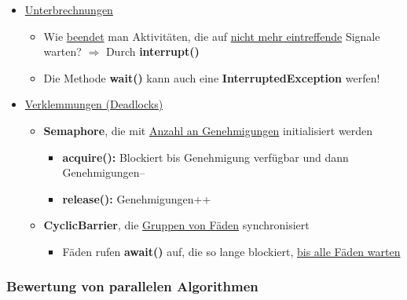 \begin{itemize}
\begin{itemize}
\begin{itemize}
						\color{red}{$\Rightarrow$ Sicher ist nur: notifyAll()}
					\end{itemize}
				\end{itemize}
				\item \underline{Unterbrechnungen}
				\begin{itemize}
					\item Wie \underline{beendet} man Aktivitäten, die auf \underline{nicht mehr eintreffende} Signale warten?
					$\Rightarrow$ Durch \textbf{interrupt()}
					\item Die Methode \textbf{wait()} kann auch eine \textbf{InterruptedException} werfen!
				\end{itemize}
				\item \underline{Verklemmungen (Deadlocks)}
				\begin{itemize}
					\item \textbf{Semaphore}, die mit \underline{Anzahl an Genehmigungen} initialisiert werden
					\begin{itemize}
						\item \textbf{acquire():} Blockiert bis Genehmigung verfügbar und dann Genehmigungen--
						\item \textbf{release():} Genehmigungen++
					\end{itemize}
					\item \textbf{CyclicBarrier}, die \underline{Gruppen von Fäden} synchronisiert
					\begin{itemize}
						\item Fäden rufen \textbf{await()} auf, die so lange blockiert, \underline{bis alle Fäden warten}
					\end{itemize}
				\end{itemize}
			\end{itemize}
				
		\newpage
		\subsubsection{Bewertung von parallelen Algorithmen}
					
